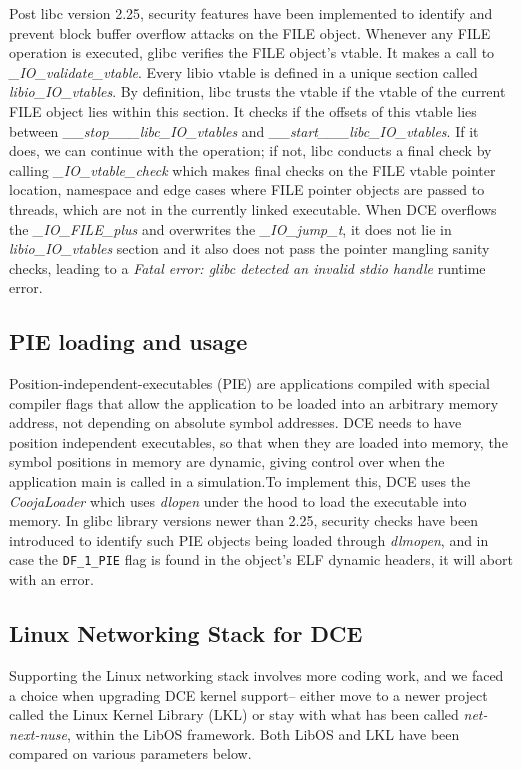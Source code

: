 \documentclass{sig-alternate}
\begin{document}
\sloppy Post libc version 2.25, security features have been implemented to identify 
and prevent block buffer overflow attacks on the FILE object. Whenever any FILE
operation is executed, glibc 
verifies the FILE object's vtable. It makes a call to 
\textit{\_IO\_validate\_vtable}. Every libio vtable is defined in a unique section called \textit{libio\_IO\_vtables}. By definition, libc trusts
the vtable if the vtable of the current FILE object lies within this section. It checks if the offsets of this vtable lies between 
\textit{\_\_stop\_\_\_libc\_IO\_vtables} and \textit{\_\_start\_\_\_libc\_IO\_vtables}.  If it does, we can continue with the operation; if not, libc 
conducts a final check by calling \textit{\_IO\_vtable\_check} which makes final checks on the FILE vtable pointer location, namespace and edge cases
where FILE pointer  objects are passed to threads, which are not in the currently linked executable.  When DCE overflows the \textit{\_IO\_FILE\_plus} and 
overwrites the \textit{\_IO\_jump\_t}, it does not lie in \textit{libio\_IO\_vtables} section and it also does not pass the pointer mangling sanity checks, leading to 
a \textit{Fatal error: glibc detected an invalid stdio handle} runtime error.

\subsection{PIE loading and usage}
Position-independent-executables (PIE) are applications compiled with special compiler flags that allow the application to be loaded into an arbitrary
memory address, not depending on absolute symbol addresses. DCE needs to have position independent executables, so that when they are loaded into memory,
the symbol positions in memory are dynamic, giving control over when the application main is called in a simulation.To implement this, DCE uses the \textit{CoojaLoader}
which uses \textit{dlopen} under the hood to load the executable into memory. In glibc library versions newer than 2.25, security checks have been introduced to 
identify such PIE objects being loaded through \textit{dlmopen}, and in case the \texttt{DF\_1\_PIE} flag is found in the object's ELF dynamic headers, it will abort 
with an error.
 

\subsection{Linux Networking Stack for DCE}
Supporting the Linux networking stack involves more coding work, and we faced
a choice when upgrading DCE kernel support-- either move to a newer project
called the Linux Kernel Library (LKL) or stay with what has been called
\emph{net-next-nuse}, within the LibOS framework.
Both LibOS and LKL have been compared on various parameters below.
\end{document}
